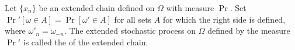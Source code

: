 Let $\{x_n\}$ be an extended chain defined on $\Omega$ with measure $\Pr$. Set $\Pr'[\omega \in A] = \Pr[\omega' \in A]$ for all sets $A$ for which the right side is defined, where $\omega'_n = \omega_{-n}$. The extended stochastic process on $\Omega$ defined by the measure $\Pr'$ is called the  of the extended chain.
